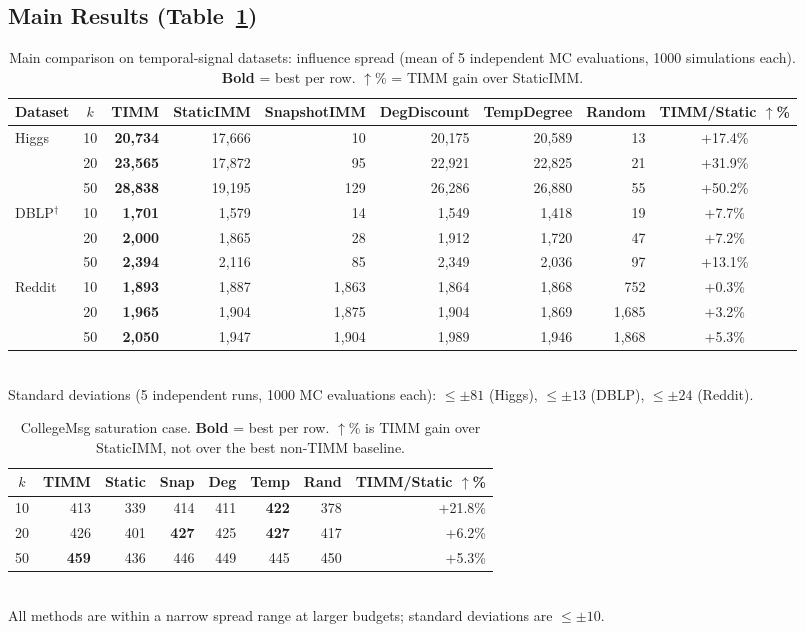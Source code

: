\documentclass[10pt,conference]{IEEEtran}
\begin{document}
\subsection{Main Results (Table~\ref{tab:main})}

\begin{table}[t]
\centering
\caption{Main comparison on temporal-signal datasets: influence spread (mean of 5 independent MC evaluations, 1000 simulations each). \textbf{Bold} = best per row. $\uparrow$\% = TIMM gain over StaticIMM.}
\label{tab:main}
\small
\begin{tabular}{lcrrrrrrc}
\toprule
Dataset & $k$ & TIMM & StaticIMM & SnapshotIMM & DegDiscount & TempDegree & Random & TIMM/Static $\uparrow$\% \\
\midrule
\multirow{3}{*}{Higgs} 
& 10 & \textbf{20,734} & 17,666 & 10 & 20,175 & 20,589 & 13 & +17.4\% \\
& 20 & \textbf{23,565} & 17,872 & 95 & 22,921 & 22,825 & 21 & +31.9\% \\
& 50 & \textbf{28,838} & 19,195 & 129 & 26,286 & 26,880 & 55 & +50.2\% \\
\midrule
\multirow{3}{*}{DBLP$^\dagger$} 
& 10 & \textbf{1,701} & 1,579 & 14 & 1,549 & 1,418 & 19 & +7.7\% \\
& 20 & \textbf{2,000} & 1,865 & 28 & 1,912 & 1,720 & 47 & +7.2\% \\
& 50 & \textbf{2,394} & 2,116 & 85 & 2,349 & 2,036 & 97 & +13.1\% \\
\midrule
\multirow{3}{*}{Reddit} 
& 10 & \textbf{1,893} & 1,887 & 1,863 & 1,864 & 1,868 & 752 & +0.3\% \\
& 20 & \textbf{1,965} & 1,904 & 1,875 & 1,904 & 1,869 & 1,685 & +3.2\% \\
& 50 & \textbf{2,050} & 1,947 & 1,904 & 1,989 & 1,946 & 1,868 & +5.3\% \\
\bottomrule
\end{tabular}\\[3pt]
\footnotesize
Standard deviations (5 independent runs, 1000 MC evaluations each): $\le \pm 81$ (Higgs), $\le \pm 13$ (DBLP), $\le \pm 24$ (Reddit).
\end{table}

\begin{table}[t]
\centering
\caption{CollegeMsg saturation case. \textbf{Bold} = best per row. $\uparrow$\% is TIMM gain over StaticIMM, not over the best non-TIMM baseline.}
\label{tab:collegemsg}
\footnotesize
\setlength{\tabcolsep}{3pt}
\begin{tabular}{@{}crrrrrrr@{}}
\toprule
$k$ & TIMM & Static & Snap & Deg & Temp & Rand & TIMM/Static $\uparrow$\% \\
\midrule
10 & 413 & 339 & 414 & 411 & \textbf{422} & 378 & +21.8\% \\
20 & 426 & 401 & \textbf{427} & 425 & \textbf{427} & 417 & +6.2\% \\
50 & \textbf{459} & 436 & 446 & 449 & 445 & 450 & +5.3\% \\
\bottomrule
\end{tabular}\\[3pt]
\footnotesize
All methods are within a narrow spread range at larger budgets; standard deviations are $\le \pm 10$.
\end{table}
\end{document}
